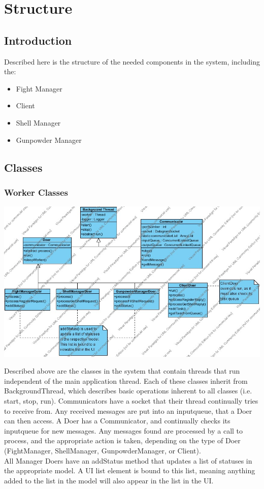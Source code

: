 \documentclass[12pt]{article}
\begin{document}
	\section{Structure}
		\subsection{Introduction}
			Described here is the structure of the needed components in the system, including the:
				\begin{itemize}
					\item{Fight Manager}
					\item{Client}
					\item{Shell Manager}
					\item{Gunpowder Manager}
				\end{itemize}
		\subsection{Classes}
			\subsubsection{Worker Classes}
				\begin{center}
					\includegraphics[width=\textwidth]{Diagrams/Structure Diagrams/ThreadingStructure.jpg}
				\end{center}
				\indent Described above are the classes in the system that contain threads that run independent of the main application thread. Each of these classes inherit from BackgroundThread, which describes basic operations inherent to all classes (i.e. start, stop, run). Communicators have a socket that their thread continually tries to receive from. Any received messages are put into an inputqueue, that a Doer can then access. A Doer has a Communicator, and continually checks its inputqueue for new messages. Any messages found are processed by a call to process, and the appropriate action is taken, depending on the type of Doer (FightManager, ShellManager, GunpowderManager, or Client).\\
				All Manager Doers have an addStatus method that updates a list of statuses in the appropriate model. A UI list element is bound to this list, meaning anything added to the list in the model will also appear in the list in the UI.
\end{document}
